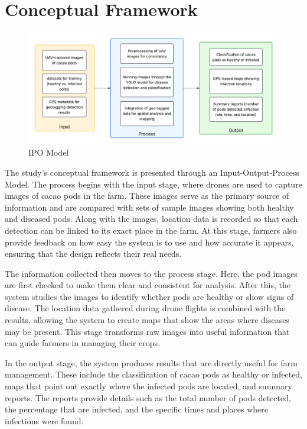 {\section{Conceptual Framework}

\begin{figure}[H]
	\centering
  \caption{IPO Model}
	\label{fig:ipo}
	\includegraphics[width=1\textwidth]{figures/IPO.pdf}
\end{figure}

The study's conceptual framework is presented through an Input-Output-Process Model. The process begins with the input stage, where drones are used to capture images of cacao pods in the farm. These images serve as the primary source of information and are compared with sets of sample images showing both healthy and diseased pods. Along with the images, location data is recorded so that each detection can be linked to its exact place in the farm. At this stage, farmers also provide feedback on how easy the system is to use and how accurate it appears, ensuring that the design reflects their real needs.

The information collected then moves to the process stage. Here, the pod images are first checked to make them clear and consistent for analysis. After this, the system studies the images to identify whether pods are healthy or show signs of disease. The location data gathered during drone flights is combined with the results, allowing the system to create maps that show the areas where diseases may be present. This stage transforms raw images into useful information that can guide farmers in managing their crops.

In the output stage, the system produces results that are directly useful for farm management. These include the classification of cacao pods as healthy or infected, maps that point out exactly where the infected pods are located, and summary reports. The reports provide details such as the total number of pods detected, the percentage that are infected, and the specific times and places where infections were found.


}
